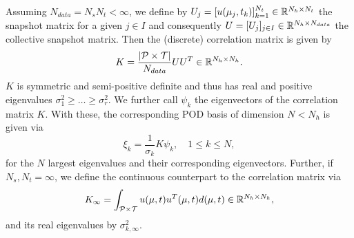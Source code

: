\begin{definition} \label{def: POD}
    Assuming $N_{data} = N_s N_t < \infty$, we define by $U_j = [u(\mu_j, t_k)]_{k = 1}^{N_t} \in \mathbb{R}^{N_h \times N_t}$ the snapshot matrix for a given $j \in I$ and consequently $U = [U_j]_{j \in I} \in \mathbb{R}^{N_h \times N_{data}}$ the collective snapshot matrix. Then the (discrete) correlation matrix is given by
    \begin{equation} \label{eq: discrete correlation matrix}
        K = \frac{\vert \mathcal{P} \times \mathcal{T} \vert}{N_{data}} U U^T \in \mathbb{R}^{N_h \times N_h}.
    \end{equation}
    $K$ is symmetric and semi-positive definite and thus has real and positive eigenvalues $\sigma^2_1 \geq \dots \geq \sigma^2_r$. We further call $\psi_k$ the eigenvectors of the correlation matrix $K$. With these, the corresponding POD basis of dimension $N < N_h$ is given via
    \begin{equation}
        \xi_k = \frac{1}{\sigma_k} K \psi_k, \quad 1 \leq k \leq N,
    \end{equation}
    for the $N$ largest eigenvalues and their corresponding eigenvectors.
    Further, if $N_s, N_t = \infty$, we define the continuous counterpart to the correlation matrix via
    \begin{equation} \label{eq: continuous correlation matrix}
        K_\infty = \int_{\mathcal{P} \times \mathcal{T}} u(\mu, t) u^T(\mu, t) d(\mu, t) \in \mathbb{R}^{N_h \times N_h},
    \end{equation}
    and its real eigenvalues by $\sigma^2_{k, \infty}$.
\end{definition}

